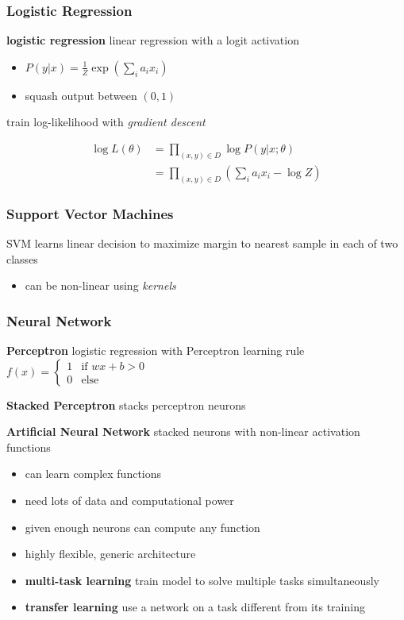 \documentclass[]{article}
\theoremstyle{definition}
\begin{document}
\subsubsection{Logistic Regression}%
\label{ssub:logistic_regression}

\textbf{logistic regression} linear regression with a logit activation
\begin{itemize}
    \item $P(y|x) = \frac{1}{Z} \exp (\sum_i a_i x_i)$
    \item squash output between $(0,1)$
\end{itemize}

train log-likelihood with \textit{gradient descent}

\begin{align}
    \log L(\theta) &= \prod_{(x,y) \in D} \log P(y|x;\theta) \\
                   &=  \prod_{(x,y) \in D} (\sum_i a_i x_i - \log Z)
\end{align}

\subsubsection{Support Vector Machines}%
\label{ssub:support_vector_machines}

SVM learns linear decision to maximize margin to nearest sample in each of two classes
\begin{itemize}
    \item can be non-linear using \textit{kernels}
\end{itemize}

\subsubsection{Neural Network}%
\label{ssub:neural_network}

\textbf{Perceptron} logistic regression with Perceptron learning rule
$f(x) = \begin{cases} 1 & \text{if } wx+b > 0 \\ 0 & \text{else} \end{cases}$

\textbf{Stacked Perceptron} stacks perceptron neurons

\textbf{Artificial Neural Network} stacked neurons with non-linear activation functions
\begin{itemize}
    \item can learn complex functions
    \item need lots of data and computational power
    \item given enough neurons can compute any function
    \item highly flexible, generic architecture
    \item \textbf{multi-task learning} train model to solve multiple tasks simultaneously
    \item \textbf{transfer learning} use a network on a task different from its training
\end{itemize}
\end{document}
